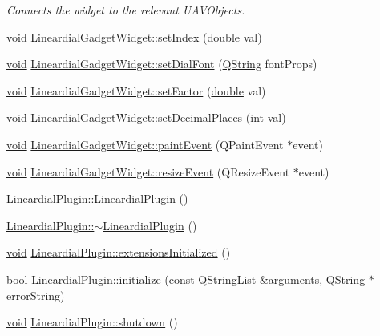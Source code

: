 \begin{DoxyCompactItemize}
\begin{DoxyCompactList}\small\item\em Connects the widget to the relevant U\-A\-V\-Objects. \end{DoxyCompactList}\item 
\hyperlink{group___u_a_v_objects_plugin_ga444cf2ff3f0ecbe028adce838d373f5c}{void} \hyperlink{group___linear_dial_plugin_ga68d6c562622c590886f5d3efceac4349}{Lineardial\-Gadget\-Widget\-::set\-Index} (\hyperlink{_super_l_u_support_8h_a8956b2b9f49bf918deed98379d159ca7}{double} val)
\item 
\hyperlink{group___u_a_v_objects_plugin_ga444cf2ff3f0ecbe028adce838d373f5c}{void} \hyperlink{group___linear_dial_plugin_ga65e46979b848fd423f40d6b001e04ffa}{Lineardial\-Gadget\-Widget\-::set\-Dial\-Font} (\hyperlink{group___u_a_v_objects_plugin_gab9d252f49c333c94a72f97ce3105a32d}{Q\-String} font\-Props)
\item 
\hyperlink{group___u_a_v_objects_plugin_ga444cf2ff3f0ecbe028adce838d373f5c}{void} \hyperlink{group___linear_dial_plugin_gad4c7bf09ce46f89db163dee80784418b}{Lineardial\-Gadget\-Widget\-::set\-Factor} (\hyperlink{_super_l_u_support_8h_a8956b2b9f49bf918deed98379d159ca7}{double} val)
\item 
\hyperlink{group___u_a_v_objects_plugin_ga444cf2ff3f0ecbe028adce838d373f5c}{void} \hyperlink{group___linear_dial_plugin_ga1c62c1ba4256fcbe4654bb904003c3b5}{Lineardial\-Gadget\-Widget\-::set\-Decimal\-Places} (\hyperlink{ioapi_8h_a787fa3cf048117ba7123753c1e74fcd6}{int} val)
\item 
\hyperlink{group___u_a_v_objects_plugin_ga444cf2ff3f0ecbe028adce838d373f5c}{void} \hyperlink{group___linear_dial_plugin_ga80239da240f9678e9cf4d2de3d9f6568}{Lineardial\-Gadget\-Widget\-::paint\-Event} (Q\-Paint\-Event $\ast$event)
\item 
\hyperlink{group___u_a_v_objects_plugin_ga444cf2ff3f0ecbe028adce838d373f5c}{void} \hyperlink{group___linear_dial_plugin_ga6f18ff48bf1851067cbd13d56f04fd73}{Lineardial\-Gadget\-Widget\-::resize\-Event} (Q\-Resize\-Event $\ast$event)
\item 
\hyperlink{group___linear_dial_plugin_gaeea9f7a365f52b1aef0da13809fabbc6}{Lineardial\-Plugin\-::\-Lineardial\-Plugin} ()
\item 
\hyperlink{group___linear_dial_plugin_ga945fcb418fce051d1998af913f4b6c6f}{Lineardial\-Plugin\-::$\sim$\-Lineardial\-Plugin} ()
\item 
\hyperlink{group___u_a_v_objects_plugin_ga444cf2ff3f0ecbe028adce838d373f5c}{void} \hyperlink{group___linear_dial_plugin_ga383081754a198481bde0fce79b7c01a9}{Lineardial\-Plugin\-::extensions\-Initialized} ()
\item 
bool \hyperlink{group___linear_dial_plugin_gab9c622169ddf91a97d6bd560b4f24f6f}{Lineardial\-Plugin\-::initialize} (const Q\-String\-List \&arguments, \hyperlink{group___u_a_v_objects_plugin_gab9d252f49c333c94a72f97ce3105a32d}{Q\-String} $\ast$error\-String)
\item 
\hyperlink{group___u_a_v_objects_plugin_ga444cf2ff3f0ecbe028adce838d373f5c}{void} \hyperlink{group___linear_dial_plugin_ga7a47ee89aef6192202148d71bf6a98a3}{Lineardial\-Plugin\-::shutdown} ()
\end{DoxyCompactItemize}
